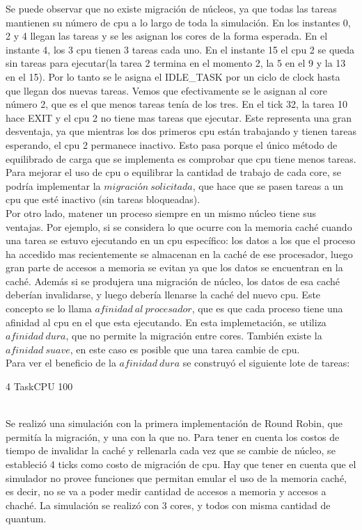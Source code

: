 Se puede observar que no existe migración de núcleos, ya que todas las tareas mantienen su número de cpu a lo largo de toda la simulación.
En los instantes 0, 2 y 4 llegan las tareas y se les asignan los cores de la forma esperada. En el instante 4, los 3 cpu tienen 3 tareas cada uno.
En el instante 15 el cpu 2 se queda sin tareas para ejecutar(la tarea 2 termina en el momento 2, la 5 en el 9 y la 13 en el 15). 
Por lo tanto se le asigna el IDLE_TASK por un ciclo de clock hasta que llegan dos nuevas tareas. Vemos que efectivamente se le asignan al core número 2,
que es el que menos tareas tenía de los tres. En el tick 32, la tarea 10 hace EXIT y el cpu 2 no tiene mas tareas que ejecutar.
Este representa una gran desventaja, ya que mientras los dos primeros cpu están trabajando y tienen tareas esperando, el cpu 2 permanece inactivo.
Esto pasa porque el único método de equilibrado de carga que se implementa es comprobar que cpu tiene menos tareas. Para mejorar el uso de cpu o equilibrar la cantidad de 
trabajo de cada core, se podría implementar la $migración\ solicitada$, que hace que se pasen tareas a un cpu que esté inactivo (sin tareas bloqueadas).\\


Por otro lado, matener un proceso siempre en un mismo núcleo tiene sus ventajas. Por ejemplo, si se considera lo que ocurre con la memoria
caché cuando una tarea se estuvo ejecutando en un cpu específico: los datos a los que el proceso ha accedido mas recientemente se almacenan en la caché de ese
procesador, luego gran parte de accesos a memoria se evitan ya que los datos se encuentran en la caché. Además si se produjera una migración de núcleo, los datos de
esa caché deberían invalidarse, y luego debería llenarse la caché del nuevo cpu. 
Este concepto se lo llama $afinidad\ al\ procesador$, que es que cada proceso tiene una afinidad al cpu en el que esta ejecutando. En esta implemetación, se 
utiliza $afinidad\ dura$, que no permite la migración entre cores. También existe la $afinidad\ suave$, en este caso es posible que una tarea cambie de cpu. \\

Para ver el beneficio de la $afinidad\ dura$ se construyó el siguiente lote de tareas: \\

\item *4 TaskCPU 100

\\
\newpage
Se realizó una simulación con la primera implementación de Round Robin, que permitía la migración, y una con la que no.
Para tener en cuenta los costos de tiempo de invalidar la caché y rellenarla cada vez que se cambie de núcleo, se estableció 4 ticks como costo de migración de cpu.
Hay que tener en cuenta que el simulador no provee funciones que permitan emular el uso de la memoria caché, es decir, no se va a poder medir cantidad de accesos
a memoria y accesos a chaché.
La simulación se realizó con 3 cores, y todos con misma cantidad de quantum.




